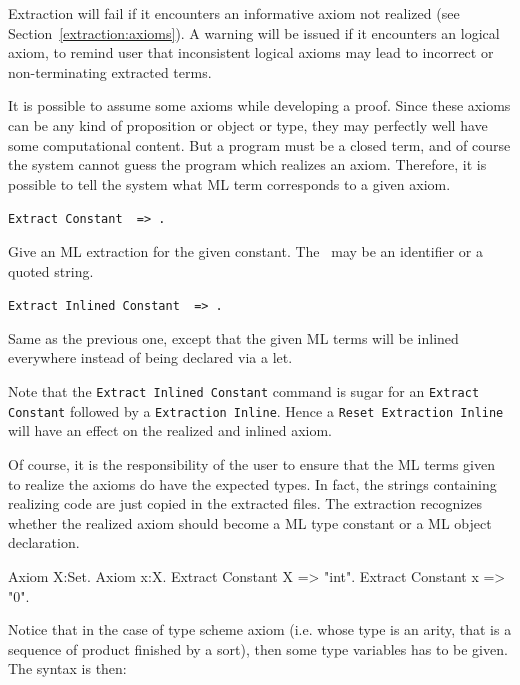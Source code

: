 \label{extraction:axioms}

Extraction will fail if it encounters an informative
axiom not realized (see Section~\ref{extraction:axioms}). 
A warning will be issued if it encounters an logical axiom, to remind 
user that inconsistent logical axioms may lead to incorrect or
non-terminating extracted terms. 

It is possible to assume some axioms while developing a proof. Since
these axioms can be any kind of proposition or object or type, they may
perfectly well have some computational content. But a program must be
a closed term, and of course the system cannot guess the program which
realizes an axiom.  Therefore, it is possible to tell the system
what ML term corresponds to a given axiom. 

\begin{description}
\item{\tt Extract Constant \qualid\ => \str.} ~\par
  Give an ML extraction for the given constant.
  The \str\ may be an identifier or a quoted string.
\item{\tt Extract Inlined Constant \qualid\ => \str.} ~\par
  Same as the previous one, except that the given ML terms will
  be inlined everywhere instead of being declared via a let.
\end{description}

Note that the {\tt Extract Inlined Constant} command is sugar
for an {\tt Extract Constant} followed by a {\tt Extraction Inline}. 
Hence a {\tt Reset Extraction Inline} will have an effect on the
realized and inlined axiom.

Of course, it is the responsibility of the user to ensure that the ML
terms given to realize the axioms do have the expected types.  In
fact, the strings containing realizing code are just copied in the
extracted files. The extraction recognizes whether the realized axiom
should become a ML type constant or a ML object declaration.

\Example
\begin{coq_example}
Axiom X:Set.
Axiom x:X.
Extract Constant X => "int".
Extract Constant x => "0".
\end{coq_example}   

Notice that in the case of type scheme axiom (i.e. whose type is an
arity, that is a sequence of product finished by a sort), then some type
variables has to be given. The syntax is then: 


